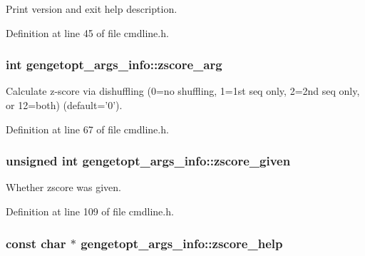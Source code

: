 Print version and exit help description. 



Definition at line 45 of file cmdline.\+h.

\hypertarget{structgengetopt__args__info_a74d8c0d931f3466ef58a09fbabe05fa3}{
\subsubsection[{zscore\+\_\+arg}]{\setlength{\rightskip}{0pt plus 5cm}int gengetopt\+\_\+args\+\_\+info\+::zscore\+\_\+arg}}\label{structgengetopt__args__info_a74d8c0d931f3466ef58a09fbabe05fa3}


Calculate z-\/score via dishuffling (0=no shuffling, 1=1st seq only, 2=2nd seq only, or 12=both) (default='0'). 



Definition at line 67 of file cmdline.\+h.

\hypertarget{structgengetopt__args__info_ae7d88b70fcb65c4b63f1f026c8cfa47e}{
\subsubsection[{zscore\+\_\+given}]{\setlength{\rightskip}{0pt plus 5cm}unsigned int gengetopt\+\_\+args\+\_\+info\+::zscore\+\_\+given}}\label{structgengetopt__args__info_ae7d88b70fcb65c4b63f1f026c8cfa47e}


Whether zscore was given. 



Definition at line 109 of file cmdline.\+h.

\hypertarget{structgengetopt__args__info_a34d3e383d7098991098429f67eeb331b}{
\subsubsection[{zscore\+\_\+help}]{\setlength{\rightskip}{0pt plus 5cm}const char $\ast$ gengetopt\+\_\+args\+\_\+info\+::zscore\+\_\+help}}\label{structgengetopt__args__info_a34d3e383d7098991098429f67eeb331b}



